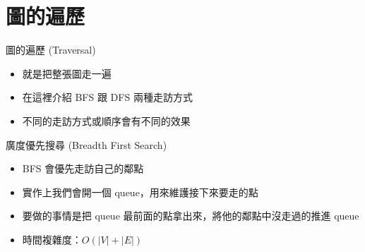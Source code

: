 \documentclass[aspectratio=169]{beamer}
\begin{document}
    \section{圖的遍歷}
    \begin{frame}{圖的遍歷 (Traversal)}
        \begin{itemize}
            \item 就是把整張圖走一遍
            \item 在這裡介紹 BFS 跟 DFS 兩種走訪方式
            \item<2-> 不同的走訪方式或順序會有不同的效果
        \end{itemize}
    \end{frame}
    \begin{frame}{廣度優先搜尋 (Breadth First Search)}
        \begin{itemize}
            \item BFS 會優先走訪自己的鄰點
            \item<2-> 實作上我們會開一個 queue，用來維護接下來要走的點
            \item<3-> 要做的事情是把 queue 最前面的點拿出來，將他的鄰點中沒走過的推進 queue
            \item<4-> 時間複雜度：$O(|V|+|E|)$
        \end{itemize}
    \end{frame}
\end{document}
